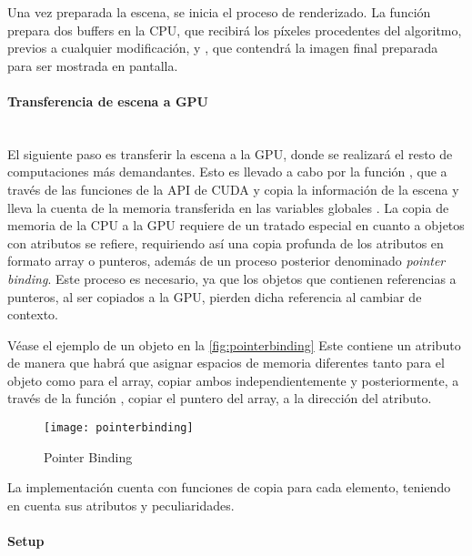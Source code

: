 Una vez preparada la escena, se inicia el proceso de renderizado. La función  prepara dos buffers en la CPU,  que recibirá los píxeles procedentes del algoritmo, previos a cualquier modificación, y , que contendrá la imagen final preparada para ser mostrada en pantalla. 

\paragraph{Transferencia de escena a GPU}\mbox{} \\

El siguiente paso es transferir la escena a la GPU, donde se realizará el resto de computaciones más demandantes. Esto es llevado a cabo por la función , que a través de las funciones de la API de CUDA  y  copia la información de la escena y lleva la cuenta de la memoria transferida en las variables globales . La copia de memoria de la CPU a la GPU requiere de un tratado especial en cuanto a objetos con atributos se refiere, requiriendo así una copia profunda de los atributos en formato array o punteros, además de un proceso posterior denominado \emph{pointer binding}. Este proceso es necesario, ya que los objetos que contienen referencias a punteros, al ser copiados a la GPU, pierden dicha referencia al cambiar de contexto. 

Véase el ejemplo de un objeto  en la \autoref{fig:pointerbinding} Este contiene un atributo  de manera que habrá que asignar espacios de memoria diferentes tanto para el objeto como para el array, copiar ambos independientemente y posteriormente, a través de la función , copiar el puntero del array, a la dirección del atributo.


\begin{figure}[H]
    \centering
	\texttt{[image: pointerbinding]}
	\caption{Pointer Binding}
	\label{fig:pointerbinding}
\end{figure}

La implementación cuenta con funciones de copia para cada elemento, teniendo en cuenta sus atributos y peculiaridades.

\paragraph{Setup}\mbox{} \\

